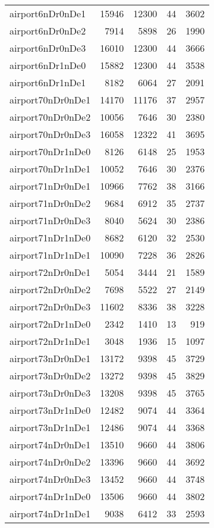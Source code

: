 \begin{longtable}{lrrrr}
airport6nDr0nDe1 & 15946 & 12300 & 44 & 3602 \\
airport6nDr0nDe2 & 7914 & 5898 & 26 & 1990 \\
airport6nDr0nDe3 & 16010 & 12300 & 44 & 3666 \\
airport6nDr1nDe0 & 15882 & 12300 & 44 & 3538 \\
airport6nDr1nDe1 & 8182 & 6064 & 27 & 2091 \\
airport70nDr0nDe1 & 14170 & 11176 & 37 & 2957 \\
airport70nDr0nDe2 & 10056 & 7646 & 30 & 2380 \\
airport70nDr0nDe3 & 16058 & 12322 & 41 & 3695 \\
airport70nDr1nDe0 & 8126 & 6148 & 25 & 1953 \\
airport70nDr1nDe1 & 10052 & 7646 & 30 & 2376 \\
airport71nDr0nDe1 & 10966 & 7762 & 38 & 3166 \\
airport71nDr0nDe2 & 9684 & 6912 & 35 & 2737 \\
airport71nDr0nDe3 & 8040 & 5624 & 30 & 2386 \\
airport71nDr1nDe0 & 8682 & 6120 & 32 & 2530 \\
airport71nDr1nDe1 & 10090 & 7228 & 36 & 2826 \\
airport72nDr0nDe1 & 5054 & 3444 & 21 & 1589 \\
airport72nDr0nDe2 & 7698 & 5522 & 27 & 2149 \\
airport72nDr0nDe3 & 11602 & 8336 & 38 & 3228 \\
airport72nDr1nDe0 & 2342 & 1410 & 13 & 919 \\
airport72nDr1nDe1 & 3048 & 1936 & 15 & 1097 \\
airport73nDr0nDe1 & 13172 & 9398 & 45 & 3729 \\
airport73nDr0nDe2 & 13272 & 9398 & 45 & 3829 \\
airport73nDr0nDe3 & 13208 & 9398 & 45 & 3765 \\
airport73nDr1nDe0 & 12482 & 9074 & 44 & 3364 \\
airport73nDr1nDe1 & 12486 & 9074 & 44 & 3368 \\
airport74nDr0nDe1 & 13510 & 9660 & 44 & 3806 \\
airport74nDr0nDe2 & 13396 & 9660 & 44 & 3692 \\
airport74nDr0nDe3 & 13452 & 9660 & 44 & 3748 \\
airport74nDr1nDe0 & 13506 & 9660 & 44 & 3802 \\
airport74nDr1nDe1 & 9038 & 6412 & 33 & 2593 \\

\end{longtable}

